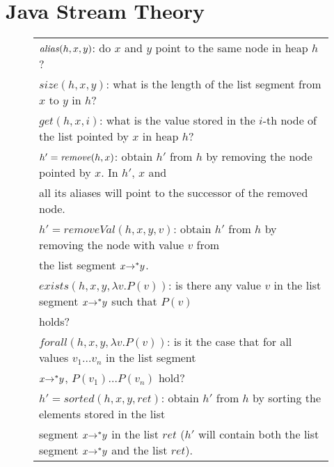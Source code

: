 \documentclass[runningheads,a4paper]{llncs}
\begin{document}
\section{Java Stream Theory} \label{sec:JCT}

\begin{figure*}[!hbt]
{\small
  \begin{tabular}{l}
 $\mathit{alias}(h,x,y)$:  do $x$ and $y$ point to the same node in heap $h$? \\
$size(h,x,y)$:  what is the length of the list segment from $x$ to $y$ in $h$?\\
    $get(h,x,i)$:  what is the value stored in the $i$-th node of the list pointed by $x$ in heap $h$?\\
 $h' = \mathit{remove}(h, x)$:  obtain $h'$ from $h$ by removing the node pointed by $x$. In $h'$, $x$
and\\ all its aliases will point to the successor of the removed node.\\
$h' = removeVal(h, x,y, v)$:  obtain $h'$ from $h$ by removing the node with value $v$ from\\ the list segment $x {\rightarrow^*} y$.\\
 $exists(h,x,y,\lambda v. P(v))$:  is there any value $v$ in the list segment $x {\rightarrow^*} y$ such that $P(v)$\\ holds?\\
 $forall(h,x,y,\lambda v. P(v))$:  is it the case that for all values $v_1 \ldots v_n$ in the list segment\\ $x {\rightarrow^*} y$, $P(v_1) \ldots P(v_n)$ hold?\\
$h'=sorted(h,x,y,ret)$:  obtain $h'$ from $h$ by sorting the elements stored in the list\\ segment $x {\rightarrow^*} y$ in the list $ret$ 
($h'$ will contain both the list segment $x {\rightarrow^*} y$ and the list $ret$).\\

\end{tabular}}
\end{figure*}
\end{document}
